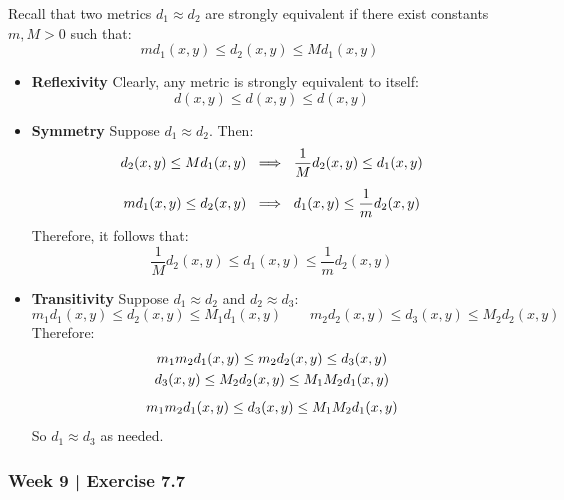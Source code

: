 \begin{pf}
    Recall that two metrics $ d_{1} \approx d_{2} $ are strongly equivalent if
    there exist constants $ m, M > 0 $ such that:
    \begin{equation*}
        md_{1}(x, y) \leq d_{2}(x, y) \leq Md_{1}(x, y)
    \end{equation*}
    \begin{itemize}
        \item \textbf{Reflexivity} \vsp
            Clearly, any metric is strongly equivalent to itself:
            \begin{equation*}
                d(x, y) \leq d(x, y) \leq d(x, y)
            \end{equation*}
        \item \textbf{Symmetry} \vsp
            Suppose $ d_{1} \approx d_{2} $. Then:
            \begin{gather*}
                d_{2}(x, y) \leq Md_{1}(x, y) \ \implies \ \frac{1}{M}d_{2}(x, y)
                \leq d_{1}(x, y) \vsp
                md_{1}(x, y) \leq d_{2}(x, y) \ \implies \ d_{1}(x, y) \leq
                \frac{1}{m}d_{2}(x, y)
            \end{gather*}
            Therefore, it follows that:
            \begin{equation*}
                \frac{1}{M}d_{2}(x, y) \leq d_{1}(x, y) \leq \frac{1}{m}d_{2}
                (x, y)
            \end{equation*}
        \item \textbf{Transitivity} \vsp
            Suppose $ d_{1} \approx d_{2} $ and $ d_{2} \approx d_{3} $:
            \begin{equation*}
                m_{1}d_{1}(x, y) \leq d_{2}(x, y) \leq M_{1}d_{1}(x, y) \qquad
                m_{2}d_{2}(x, y) \leq d_{3}(x, y) \leq M_{2}d_{2}(x, y)
            \end{equation*}
            Therefore:
            \begin{gather*}
                m_{1}m_{2}d_{1}(x, y) \leq m_{2}d_{2}(x, y) \leq d_{3}(x, y) \\
                d_{3}(x, y) \leq M_{2}d_{2}(x, y) \leq M_{1}M_{2}d_{1}(x, y) \vsp
                m_{1}m_{2}d_{1}(x, y) \leq d_{3}(x, y) \leq M_{1}M_{2}d_{1}(x, y)
            \end{gather*}
            So $ d_{1} \approx d_{3} $ as needed.
    \end{itemize}
\end{pf}
\newpage
\subsubsection{Week 9 | Exercise 7.7}

